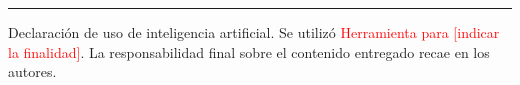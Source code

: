 \documentclass[10pt]{article}
\newcommand{\serif}{\fontfamily{bch}\selectfont}
\begin{document}
\vfill
{\color{olive}\rule{\linewidth}{2.5pt}}
\vspace{0.3cm}

\noindent
{\fontsize{18}{23}\selectfont\color{ink}
{\serif\color{olivedark}\fontsize{22}{28}\selectfont Declaración de uso de inteligencia artificial.}
Se utilizó \textcolor{red}{Herramienta para [indicar la finalidad]}.
La responsabilidad final sobre el contenido entregado recae en los autores.\par}
\end{document}
